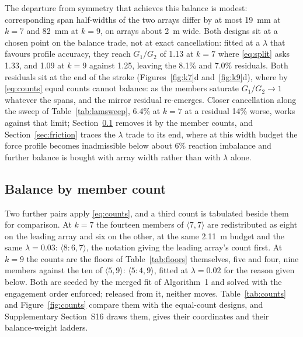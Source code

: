 \documentclass[preprint,12pt,number]{elsarticle}
\newcommand{\cfg}[2]{\langle #1,#2\rangle}
\begin{document}
The departure from symmetry that achieves this balance is modest: corresponding span half-widths of the two arrays differ by at most 19~mm at $k=7$ and 82~mm at $k=9$, on arrays about 2~m wide. Both designs sit at a chosen point on the balance trade, not at exact cancellation: fitted at a $\lambda$ that favours profile accuracy, they reach $G_1/G_2$ of 1.13 at $k=7$ where \eqref{eq:split} asks 1.33, and 1.09 at $k=9$ against 1.25, leaving the 8.1\% and 7.0\% residuals. Both residuals sit at the end of the stroke (Figures~\ref{fig:k7}d and~\ref{fig:k9}d), where by \eqref{eq:counts} equal counts cannot balance: as the members saturate $G_1/G_2 \to 1$ whatever the spans, and the mirror residual re-emerges. Closer cancellation along the sweep of Table~\ref{tab:lamsweep}, 6.4\% at $k=7$ at a residual 14\% worse, works against that limit; Section~\ref{sec:counts} removes it by the member counts, and Section~\ref{sec:friction} traces the $\lambda$ trade to its end, where at this width budget the force profile becomes inadmissible below about 6\% reaction imbalance and further balance is bought with array width rather than with $\lambda$ alone.

\subsection{Balance by member count}
\label{sec:counts}

Two further pairs apply \eqref{eq:counts}, and a third count is tabulated beside them for comparison. At $k=7$ the fourteen members of $\cfg{7}{7}$ are redistributed as eight on the leading array and six on the other, at the same 2.11~m budget and the same $\lambda = 0.03$: $\cfg{8{:}6}{7}$, the notation giving the leading array's count first. At $k=9$ the counts are the floors of Table~\ref{tab:floors} themselves, five and four, nine members against the ten of $\cfg{5}{9}$: $\cfg{5{:}4}{9}$, fitted at $\lambda = 0.02$ for the reason given below. Both are seeded by the merged fit of Algorithm~1 and solved with the engagement order enforced; released from it, neither moves. Table~\ref{tab:counts} and Figure~\ref{fig:counts} compare them with the equal-count designs, and Supplementary Section~S16 draws them, gives their coordinates and their balance-weight ladders.
\end{document}
